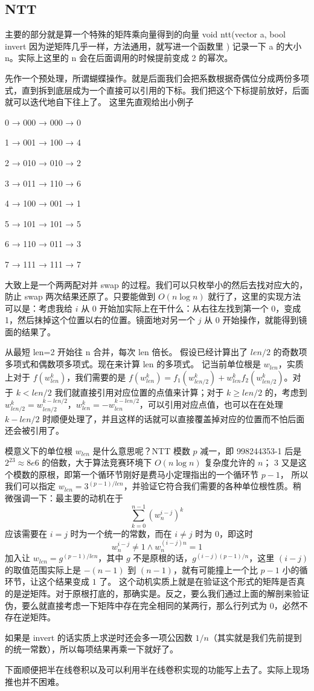 \subsection{NTT}

主要的部分就是算一个特殊的矩阵乘向量得到的向量
void ntt(vector a, bool invert 因为逆矩阵几乎一样，方法通用，就写进一个函数里 )
记录一下 a 的大小 n。实际上这里的 n 会在后面调用的时候提前变成 2 的幂次。

先作一个预处理，所谓蝴蝶操作。就是后面我们会把系数根据奇偶位分成两份多项式，直到拆到底层成为一个直接可以引用的下标。我们把这个下标提前放好，后面就可以迭代地自下往上了。
这里先直观给出小例子

0 → 000 → 000 → 0  

1 → 001 → 100 → 4  

2 → 010 → 010 → 2  

3 → 011 → 110 → 6  

4 → 100 → 001 → 1  

5 → 101 → 101 → 5  

6 → 110 → 011 → 3  

7 → 111 → 111 → 7

大致上是一个两两配对并 swap 的过程。我们可以只枚举小的然后去找对应大的，防止 swap 两次结果还原了。只要能做到 $O(n\log n)$ 就行了，这里的实现方法可以是：考虑我给 $i$ 从 $0$ 开始加实际上在干什么：从右往左找到第一个 0，变成 1，然后抹掉这个位置以右的位置。镜面地对另一个 $j$ 从 $0$ 开始操作，就能得到镜面的结果了。

从最短 len=2 开始往 n 合并，每次 len 倍长。
假设已经计算出了 $len/2$ 的奇数项多项式和偶数项多项式。现在来计算 len 的多项式。
记当前单位根是 $w_{len}$，实质上对于 $f(w_{len}^{k})$，我们需要的是 $f(w_{len}^{k}) = f_1(w_{len/2}^{k}) +w_{len}^{k}f_2(w_{len/2}^{k})$。对于 $k<len/2$ 我们就直接引用对应位置的点值来计算；对于 $k\ge len/2$ 的，考虑到 $w_{len/2}^{k} = w_{len/2}^{k-len/2}$，$w_{len}^{k} = -w_{len}^{k-len/2}$，可以引用对应点值，也可以在在处理 $k-len/2$ 时顺便处理了，并且这样的话就可以直接覆盖掉对应的位置而不怕后面还会被引用了。

模意义下的单位根 $w_{len}$ 是什么意思呢？NTT 模数 $p$ 减一，即 998244353-1 后是 $2^{23}\approx 8e6$ 的倍数，大于算法竞赛环境下 $O(n\log n)$ 复杂度允许的 $n$；
$3$ 又是这个模数的原根，即第一个循环节刚好是费马小定理指出的一个循环节 $p-1$，
所以我们可以指定 $w_{len} = 3^{(p-1)/len}$，并验证它符合我们需要的各种单位根性质。稍微强调一下：最主要的动机在于
$$
\sum_{k=0}^{n-1}(w_n^{i-j})^{k}
$$
应该需要在 $i=j$ 时为一个统一的常数，而在 $i\not=j$ 时为 $0$，即这时
$$
w_{n}^{i-j}\not= 1 \land w_{n}^{(i-j)n}=1
$$
加入让 $w_{len}=g^{(p-1)/len}$，其中 $g$ 不是原根的话，$g^{(i-j)(p-1)/n}$，这里 $(i-j)$ 的取值范围实际上是 $-(n-1)$ 到 $(n-1)$，就有可能撞上一个比 $p-1$ 小的循环节，让这个结果变成 $1$ 了。
这个动机实质上就是在验证这个形式的矩阵是否真的是逆矩阵。对于原根打底的，那确实是。反之，要么我们通过上面的解剖来验证伪，要么就直接考虑一下矩阵中存在完全相同的某两行，那么行列式为 $0$，必然不存在逆矩阵。


如果是 invert 的话实质上求逆时还会多一项公因数 $1/n$（其实就是我们先前提到的统一常数），所以每项结果再乘一下就好了。

下面顺便把半在线卷积以及可以利用半在线卷积实现的功能写上去了。实际上现场推也并不困难。

